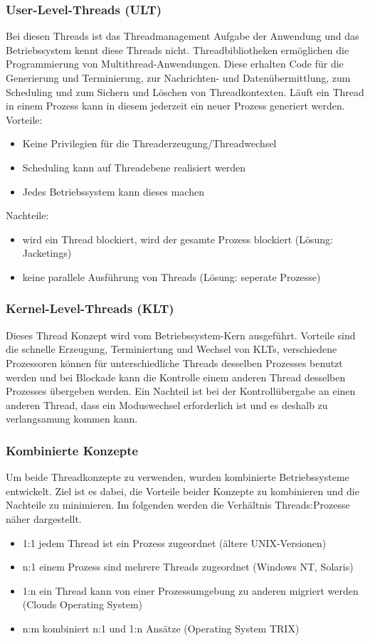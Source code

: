 \documentclass{article}
\begin{document}
\subsubsection{User-Level-Threads (ULT)}
    Bei diesen Threads ist das Threadmanagement Aufgabe der Anwendung und das Betriebssystem kennt diese Threads nicht. Threadbibliotheken ermöglichen die Programmierung von Multithread-Anwendungen. Diese erhalten Code für die Generierung und Terminierung, zur Nachrichten- und Datenübermittlung, zum Scheduling und zum Sichern und Löschen von Threadkontexten.\newline
    Läuft ein Thread in einem Prozess kann in diesem jederzeit ein neuer Prozess generiert werden.\newline
    Vorteile:
    \begin{itemize}
        \item Keine Privilegien für die Threaderzeugung/Threadwechsel
        \item Scheduling kann auf Threadebene realisiert werden
        \item Jedes Betriebssystem kann dieses machen
    \end{itemize}
    Nachteile:
    \begin{itemize}
        \item wird ein Thread blockiert, wird der gesamte Prozess blockiert (Lösung: Jacketings)
        \item keine parallele Ausführung von Threads (Lösung: seperate Prozesse)
    \end{itemize}
\subsubsection{Kernel-Level-Threads (KLT)}
    Dieses Thread Konzept wird vom Betriebssystem-Kern ausgeführt. Vorteile sind die schnelle Erzeugung, Terminiertung und Wechsel von KLTs, verschiedene Prozessoren können für unterschiedliche Threads desselben Prozesses benutzt werden und bei Blockade kann die Kontrolle einem anderen Thread desselben Prozesses übergeben werden. Ein Nachteil ist bei der Kontrollübergabe an einen anderen Thread, dass ein Moduswechsel erforderlich ist und es deshalb zu verlangsamung kommen kann.
\subsubsection{Kombinierte Konzepte}
     Um beide Threadkonzepte zu verwenden, wurden kombinierte Betriebssysteme entwickelt. Ziel ist es dabei, die Vorteile beider Konzepte zu kombinieren und die Nachteile zu minimieren. Im folgenden werden die Verhältnis Threads:Prozesse näher dargestellt.
     \begin{itemize}
         \item 1:1 jedem Thread ist ein Prozess zugeordnet (ältere UNIX-Versionen)
         \item n:1 einem Prozess sind mehrere Threads zugeordnet (Windows NT, Solaris)
         \item 1:n ein Thread kann von einer Prozessumgebung zu anderen migriert werden (Clouds Operating System)
         \item n:m kombiniert n:1 und 1:n Ansätze (Operating System TRIX)
     \end{itemize} 
\end{document}
